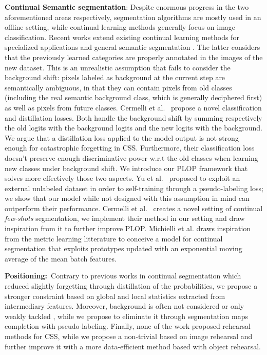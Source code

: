 \noindent\textbf{Continual Semantic segmentation}: Despite enormous progress in the two
aforementioned areas respectively, segmentation algorithms are mostly used in an offline setting,
while continual learning methods generally focus on image classification. Recent works extend
existing continual learning methods \citep{li2018lwf,hou2019ucir} for specialized applications
\citep{ozdemir2018learnthenewkeeptheold,ozdemir2019segmentationanotomical,tasar19incrementsegmentationremotesensing}
and general semantic segmentation \citep{michieli2019ilt}. The latter considers that the previously
learned categories are properly annotated in the images of the new dataset. This is an unrealistic
assumption that fails to consider the background shift: pixels labeled as background at the current
step are semantically ambiguous, in that they can contain pixels from old classes (including the
real semantic background class, which is generally deciphered first) as well as pixels from future
classes. Cermelli et al.~\citep{cermelli2020modelingthebackground} propose a novel classification and
distillation losses. Both handle the background shift by summing respectively the old logits with
the background logits and the new logits with the background. We argue that a distillation loss
applied to the model output is not strong enough for catastrophic forgetting in CSS. Furthermore,
their classification loss doesn't preserve enough discriminative power w.r.t the old classes when
learning new classes under background shift. We introduce our PLOP framework that solves more
effectively those two aspects. Yu et al.~\citep{yu2020continualsegmentationselftraining} proposed to
exploit an external unlabeled dataset in order to self-training through a pseudo-labeling loss; we
show that our model while not designed with this assumption in mind can outperform their
performance. Cermelli et al.~\citep{cermelli2020fewshotcontinualsegm} creates a novel setting of
continual \textit{few-shots} segmentation, we implement their method in our setting and draw
inspiration from it to further improve PLOP. Michielli et al.\citep{michieli2021sdr} draws
inspiration from the metric learning litterature to conceive a model for continual segmentation that
exploits prototypes updated with an exponential moving average of the mean batch features.

\noindent\textbf{Positioning:\,} Contrary to previous works in continual segmentation
\citep{michieli2019ilt,cermelli2020modelingthebackground} which reduced slightly forgetting through
distillation of the probabilities, we propose a stronger constraint based on global and local
statistics extracted from intermediary features. Moreover, background is often not considered
\citep{michieli2019ilt} or only weakly tackled \citep{cermelli2020modelingthebackground}, while we
propose to eliminate it through segmentation maps completion with pseudo-labeling. Finally, none of
the work proposed rehearsal methods for CSS, while we propose a non-trivial based on image rehearsal
and further improve it with a more data-efficient method based with object rehearsal.


